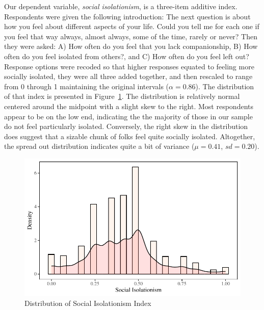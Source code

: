 \documentclass[]{interact}
\theoremstyle{plain}%
\theoremstyle{definition}
\theoremstyle{remark}
\begin{document}
Our dependent variable, \emph{social isolationism}, is a three-item
additive index. Respondents were given the following introduction: The
next question is about how you feel about different aspects of your
life. Could you tell me for each one if you feel that way always, almost
always, some of the time, rarely or never? Then they were asked: A) How
often do you feel that you lack companionship, B) How often do you feel
isolated from others?, and C) How often do you feel left out? Response
options were recoded so that higher responses equated to feeling more
socially isolated, they were all three added together, and then rescaled
to range from 0 through 1 maintaining the original intervals
(\(\alpha = 0.86\)). The distribution of that index is presented in
Figure~\ref{fig-social-iso-dist}. The distribution is relatively normal
centered around the midpoint with a slight skew to the right. Most
respondents appear to be on the low end, indicating the the majority of
those in our sample do not feel particularly isolated. Conversely, the
right skew in the distribution does suggest that a sizable chunk of
folks feel quite socially isolated. Altogether, the spread out
distribution indicates quite a bit of variance (\(\mu = 0.41\),
\(sd = 0.20\)).

\begin{figure}

{\centering \includegraphics{Social-Isolation-in-China-jg-revised_files/figure-pdf/fig-social-iso-dist-1.pdf}

}

\caption{\label{fig-social-iso-dist}Distribution of Social Isolationism
Index}

\end{figure}
\end{document}
